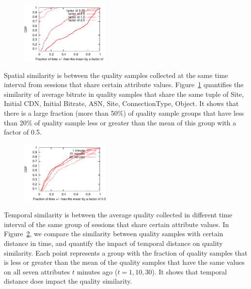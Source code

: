 {\begin{figure}[h!]
\centering
 \includegraphics[width=0.4\textwidth] {figures/spatial-similarity.pdf}
\label{fig:spatial-similarity}
\end{figure}

 Spatial similarity is between the quality samples collected at the same time interval from sessions that share certain attribute values.  Figure~\ref{fig:spatial-similarity} quantifies the similarity of average bitrate in quality samples that share the same tuple of Site, Initial CDN, Initial Bitrate, ASN, Site, ConnectionType, Object. It shows that there is a large fraction (more than 50\%) of quality sample groups that have less than 20\% of quality sample less or greater than the mean of this group with a factor of 0.5.

\begin{figure}[h!]
\centering
 \includegraphics[width=0.4\textwidth] {figures/temporal-similarity.pdf}
\label{fig:temporal-similarity}
\end{figure}

 Temporal similarity is between the average quality collected in different time interval of the same group of sessions that share certain attribute values. In Figure~\ref{fig:temporal-similarity}, we compare the similarity between quality samples with certain distance in time, and quantify the impact of temporal distance on quality similarity. Each point represents a group with the fraction of quality samples that is less or greater than the mean of the quality samples that have the same values on all seven attributes $t$ minutes ago ($t=1,10,30$). It shows that temporal distance does impact the quality similarity. 

}
